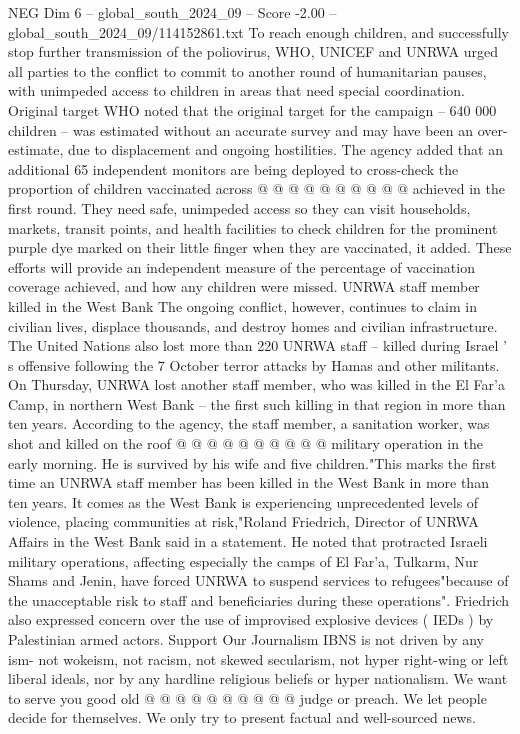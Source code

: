 \begin{textsample}{NEG Dim 6 – global\_south\_2024\_09 – Score -2.00 – global\_south\_2024\_09/114152861.txt}
To reach enough children, and successfully stop further transmission of the poliovirus, WHO, UNICEF and UNRWA urged all parties to the conflict to commit to another round of humanitarian pauses, with unimpeded access to children in areas that need special coordination.
Original target WHO noted that the original target for the campaign -- 640 000 children -- was estimated without an accurate survey and may have been an over-estimate, due to displacement and ongoing hostilities.
The agency added that an additional 65 independent monitors are being deployed to cross-check the proportion of children vaccinated across @ @ @ @ @ @ @ @ @ @ achieved in the first round.
They need safe, unimpeded access so they can visit households, markets, transit points, and health facilities to check children for the prominent purple dye marked on their little finger when they are vaccinated, it added.
These efforts will provide an independent measure of the percentage of vaccination coverage achieved, and how any children were missed.
UNRWA staff member killed in the West Bank The ongoing conflict, however, continues to claim in civilian lives, displace thousands, and destroy homes and civilian infrastructure.
The United Nations also lost more than 220 UNRWA staff -- killed during Israel ' s offensive following the 7 October terror attacks by Hamas and other militants.
On Thursday, UNRWA lost another staff member, who was killed in the El Far'a Camp, in northern West Bank -- the first such killing in that region in more than ten years.
According to the agency, the staff member, a sanitation worker, was shot and killed on the roof @ @ @ @ @ @ @ @ @ @ military operation in the early morning.
He is survived by his wife and five children."This marks the first time an UNRWA staff member has been killed in the West Bank in more than ten years.
It comes as the West Bank is experiencing unprecedented levels of violence, placing communities at risk,"Roland Friedrich, Director of UNRWA Affairs in the West Bank said in a statement.
He noted that protracted Israeli military operations, affecting especially the camps of El Far'a, Tulkarm, Nur Shams and Jenin, have forced UNRWA to suspend services to refugees"because of the unacceptable risk to staff and beneficiaries during these operations".
Friedrich also expressed concern over the use of improvised explosive devices ( IEDs ) by Palestinian armed actors.
Support Our Journalism IBNS is not driven by any ism- not wokeism, not racism, not skewed secularism, not hyper right-wing or left liberal ideals, nor by any hardline religious beliefs or hyper nationalism.
We want to serve you good old @ @ @ @ @ @ @ @ @ @ judge or preach.
We let people decide for themselves.
We only try to present factual and well-sourced news.

\end{textsample}
